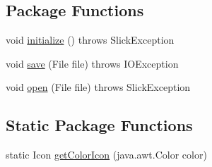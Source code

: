 \subsection*{Package Functions}
\begin{DoxyCompactItemize}
\item 
void \mbox{\hyperlink{classorg_1_1newdawn_1_1slick_1_1tools_1_1hiero_1_1_hiero_a03f0e98d12c2117ec8521ded2b737c99}{initialize}} ()  throws Slick\+Exception 
\item 
void \mbox{\hyperlink{classorg_1_1newdawn_1_1slick_1_1tools_1_1hiero_1_1_hiero_a078b77ff73e2286fc28b18c9a4f318a6}{save}} (File file)  throws I\+O\+Exception 
\item 
void \mbox{\hyperlink{classorg_1_1newdawn_1_1slick_1_1tools_1_1hiero_1_1_hiero_a12c8a8bdd2025e9f45f487f773789ff8}{open}} (File file)  throws Slick\+Exception 
\end{DoxyCompactItemize}
\subsection*{Static Package Functions}
\begin{DoxyCompactItemize}
\item 
static Icon \mbox{\hyperlink{classorg_1_1newdawn_1_1slick_1_1tools_1_1hiero_1_1_hiero_a965ca93fb655336c8320938445d75ece}{get\+Color\+Icon}} (java.\+awt.\+Color color)
\end{DoxyCompactItemize}
